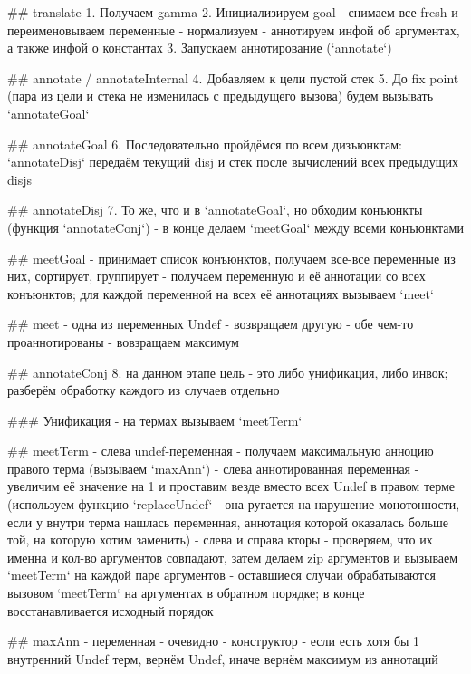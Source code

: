\documentclass[conference]{IEEEtran}
\begin{document}
## translate
1. Получаем gamma
2. Инициализируем goal
  - снимаем все fresh и переименовываем переменные
  - нормализуем
  - аннотируем инфой об аргументах, а также инфой о константах
3. Запускаем аннотирование (`annotate`)

## annotate / annotateInternal
4. Добавляем к цели пустой стек 
5. До fix point (пара из цели и стека не изменилась с предыдущего вызова) будем вызывать `annotateGoal`

## annotateGoal
6. Последовательно пройдёмся по всем дизъюнктам: `annotateDisj` передаём текущий disj и стек после вычислений всех предыдущих disjs

## annotateDisj
7. То же, что и в `annotateGoal`, но обходим конъюнкты (функция `annotateConj`) - в конце делаем `meetGoal` между всеми конъюнктами

## meetGoal
- принимает список конъюнктов, получаем все-все переменные из них, сортирует, группирует - получаем переменную и её аннотации со всех конъюнктов; для каждой переменной на всех её аннотациях вызываем `meet`

## meet
- одна из переменных Undef - возвращаем другую
- обе чем-то проаннотированы - вовзращаем максимум

## annotateConj
8. на данном этапе цель - это либо унификация, либо инвок; разберём обработку каждого из случаев отдельно

### Унификация
- на термах вызываем `meetTerm`

## meetTerm
- слева undef-переменная - получаем максимальную анноцию правого терма (вызываем `maxAnn`)
- слева аннотированная переменная - увеличим её значение на 1 и проставим везде вместо всех Undef в правом терме (используем функцию `replaceUndef` - она ругается на нарушение монотонности, если у внутри терма нашлась переменная, аннотация которой оказалась больше той, на которую хотим заменить)
- слева и справа кторы - проверяем, что их именна и кол-во аргументов совпадают, затем делаем zip аргументов и вызываем `meetTerm` на каждой паре аргументов
- оставшиеся случаи обрабатываются вызовом `meetTerm` на аргументах в обратном порядке; в конце восстанавливается исходный порядок

## maxAnn
- переменная - очевидно
- конструктор - если есть хотя бы 1 внутренний Undef терм, вернём Undef, иначе вернём максимум из аннотаций
\end{document}
